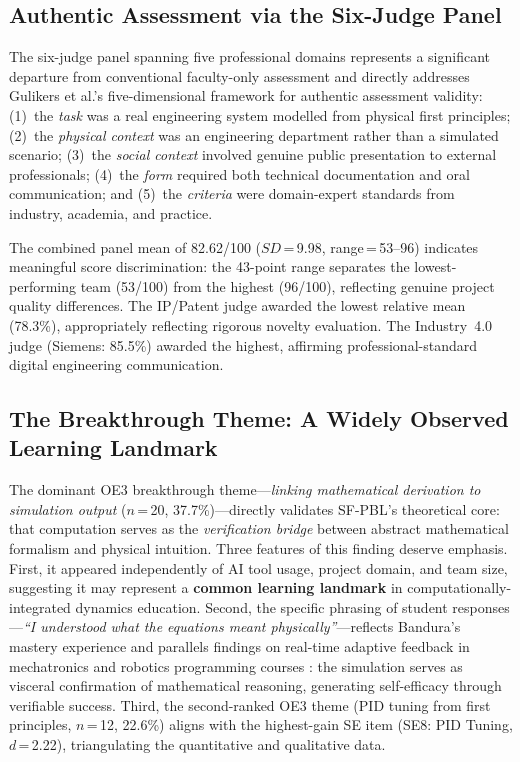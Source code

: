 \documentclass[utf8]{FrontiersinHarvard}
\begin{document}
\subsection{Authentic Assessment via the Six-Judge Panel}

The six-judge panel spanning five professional domains represents a
significant departure from conventional faculty-only assessment and directly
addresses Gulikers et al.'s \citeyearpar{gulikers2004five} five-dimensional
framework for authentic assessment validity: (1)~the \textit{task} was
a real engineering system modelled from physical first principles;
(2)~the \textit{physical context} was an engineering department rather
than a simulated scenario; (3)~the \textit{social context} involved
genuine public presentation to external professionals; (4)~the
\textit{form} required both technical documentation and oral communication;
and (5)~the \textit{criteria} were domain-expert standards from industry,
academia, and practice.

The combined panel mean of 82.62/100 ($SD$\,=\,9.98, range\,=\,53--96)
indicates meaningful score discrimination: the 43-point range separates
the lowest-performing team (53/100) from the highest (96/100), reflecting
genuine project quality differences. The IP/Patent judge awarded the lowest
relative mean (78.3\%), appropriately reflecting rigorous novelty
evaluation. The Industry~4.0 judge (Siemens: 85.5\%) awarded the highest,
affirming professional-standard digital engineering communication.

\subsection{The Breakthrough Theme: A Widely Observed Learning Landmark}

The dominant OE3 breakthrough theme---\textit{linking mathematical
derivation to simulation output} ($n$\,=\,20, 37.7\%)---directly validates
SF-PBL's theoretical core: that computation serves as the
\textit{verification bridge} between abstract mathematical formalism and
physical intuition. Three features of this finding deserve emphasis.
First, it appeared independently of AI tool usage, project domain, and team
size, suggesting it may represent a \textbf{common learning landmark} in
computationally-integrated dynamics education. Second, the specific phrasing
of student responses---\textit{``I understood what the equations meant
physically''}---reflects Bandura's \citeyearpar{bandura1997self} mastery
experience and parallels findings on real-time adaptive feedback in
mechatronics and robotics programming courses \citep{nanade2026adaptive}:
the simulation serves as visceral confirmation of mathematical
reasoning, generating self-efficacy through verifiable success. Third, the
second-ranked OE3 theme (PID tuning from first principles, $n$\,=\,12,
22.6\%) aligns with the highest-gain SE item (SE8: PID Tuning,
$d$\,=\,2.22), triangulating the quantitative and qualitative data.
\end{document}
